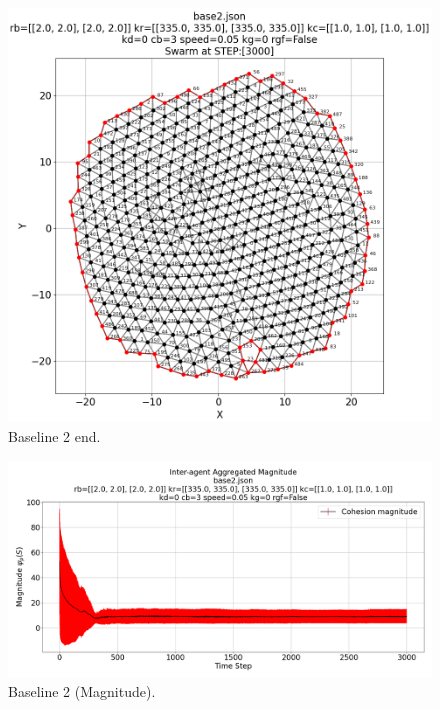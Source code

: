 \documentclass[12pt,a4paper]{IEEEtran}
\begin{document}
\begin{figure}[H]
	\begin{center}
		\includegraphics[width=1.0\linewidth]{figures/baseline2-2}
	\end{center}
	\caption{Baseline 2 end. \label{fig:baseline2-2}}
\end{figure}

\begin{figure}[H]
	\begin{center}
		\includegraphics[width=1.0\linewidth]{figures/baseline2Magnitude}
	\end{center}
	\caption{Baseline 2 (Magnitude). \label{fig:baseline2Magnitude}}
\end{figure}
\end{document}
